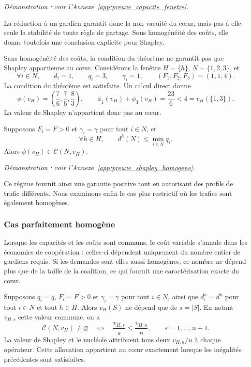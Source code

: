 \emph{Démonstration : voir l'Annexe~\ref{app:preuve_capacite_fenetre}.}

La réduction à un gardien garantit donc la non-vacuité du cœur, mais pas à
elle seule la stabilité de toute règle de partage. Sous homogénéité des coûts,
elle donne toutefois une conclusion explicite pour Shapley.

\begin{remarque}
Sans homogénéité des coûts, la condition du théorème ne garantit pas que
Shapley appartienne au cœur. Considérons la fenêtre
\(H=\{h\}\), \(N=\{1,2,3\}\), et
\[
\forall i\in N,\qquad d_i=1,\qquad q_i=3,\qquad \gamma_i=1,
\qquad (F_1,F_2,F_3)=(1,1,4).
\]
La condition du théorème est satisfaite. Un calcul direct donne
\[
\phi(v_H)=\left(\frac76,\frac76,\frac83\right),
\qquad
\phi_1(v_H)+\phi_3(v_H)=\frac{23}{6}<4=v_H(\{1,3\}).
\]
La valeur de Shapley n'appartient donc pas au cœur.
\end{remarque}

\begin{corollaire}
\label{cor:shapley_coeur_tres_faible_trafic_homogene}
Supposons \(F_i=F>0\) et \(\gamma_i=\gamma\) pour tout \(i\in N\), et
\[
    \forall h\in H,\qquad
    d^h(N)\leqslant\min_{i\in N}q_i.
\]
Alors \(\phi(v_H)\in\mathcal C(N,v_H)\).
\end{corollaire}

\emph{Démonstration : voir l'Annexe~\ref{app:preuve_shapley_homogene}.}

Ce régime fournit ainsi une garantie positive tout en autorisant des profils
de trafic différents. Nous examinons enfin le cas plus restrictif où les
trafics sont également homogènes.

\subsubsection{Cas parfaitement homogène}
\label{subsubsec:cas_homogene}

Lorsque les capacités et les coûts sont communs, le coût variable s'annule
dans les économies de coopération : celles-ci dépendent uniquement du nombre
entier de gardiens requis. Si les demandes sont elles aussi homogènes, ce
nombre ne dépend plus que de la taille de la coalition, ce qui fournit une
caractérisation exacte du cœur.

\begin{proposition}
\label{prop:coeur_cas_homogene}
\label{cor:partages_cas_homogene}
Supposons \(q_i=q\), \(F_i=F>0\) et \(\gamma_i=\gamma\) pour tout
\(i\in N\), ainsi que \(d_i^h=d^h\) pour tout \(i\in N\) et tout
\(h\in H\). Alors \(v_H(S)\) ne dépend que de \(s=|S|\). En notant
\(v_{H,s}\) cette valeur commune, on a
\[
    \mathcal C(N,v_H)\neq\varnothing
    \quad\Longleftrightarrow\quad
    \frac{v_{H,s}}s\leqslant\frac{v_{H,n}}n,
    \qquad s=1,\ldots,n-1.
\]
La valeur de Shapley et le nucléole attribuent tous deux \(v_{H,n}/n\) à
chaque opérateur. Cette allocation appartient au cœur exactement lorsque les
inégalités précédentes sont satisfaites.
\end{proposition}

